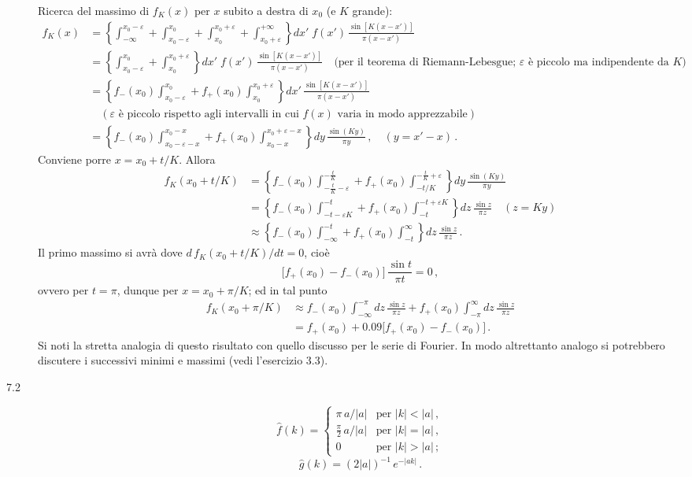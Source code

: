 \documentclass[11pt, a4paper]{book}
\numberwithin{equation}{section}
\begin{document}
\begin{description}
Ricerca del massimo di $f_K(x)$ per $x$ subito a destra di $x_0$ (e $K$ grande):
\begin{align*}
  f_K(x) &= \left\{\int_{-\infty}^{x_0-\varepsilon}+\int_{x_0-\varepsilon}^{x_0}+\int_{x_0}^{x_0+\varepsilon}+\int_{x_0+\varepsilon}^{+\infty}\right\}dx'\;f(x')\,\frac{\sin[K(x-x')]}{\pi(x-x')}\\
  &= \left\{\int_{x_0-\varepsilon}^{x_0}+\int_{x_0}^{x_0+\varepsilon}\right\}dx'\;f(x')\,\frac{\sin[K(x-x')]}{\pi(x-x')}
    \quad\text{(per il teorema di Riemann-Lebesgue; }\varepsilon\text{ è piccolo ma indipendente da }K\text{)}\\
  &= \left\{f_-(x_0)\int_{x_0-\varepsilon}^{x_0}+f_+(x_0)\int_{x_0}^{x_0+\varepsilon}\right\}dx'\,\frac{\sin[K(x-x')]}{\pi(x-x')}\\
  &\quad(\varepsilon\text{ è piccolo rispetto agli intervalli in cui }f(x)\text{ varia in modo apprezzabile})\\
  &= \left\{f_-(x_0)\int_{x_0-\varepsilon-x}^{x_0-x}+f_+(x_0)\int_{x_0-x}^{x_0+\varepsilon-x}\right\}dy\,\frac{\sin(Ky)}{\pi y}\,,
    \quad(y=x'-x)\,.
\end{align*}
Conviene porre $x = x_0+t/K$. Allora
\begin{align*}
  f_K(x_0+t/K) &= \left\{f_-(x_0)\int_{-\frac{t}{K}-\varepsilon}^{-\frac{t}{K}}+f_+(x_0)\int_{-t/K}^{-\frac{t}{K}+\varepsilon}\right\}dy\,\frac{\sin(Ky)}{\pi y}\\
  &= \left\{f_-(x_0)\int_{-t-\varepsilon K}^{-t}+f_+(x_0)\int_{-t}^{-t+\varepsilon K}\right\}dz\,\frac{\sin z}{\pi z}
    \quad(z=Ky)\\
  &\approx \left\{f_-(x_0)\int_{-\infty}^{-t}+f_+(x_0)\int_{-t}^{\infty}\right\}dz\,\frac{\sin z}{\pi z}\,.
\end{align*}
Il primo massimo si avrà dove $d\,f_K(x_0+t/K)/dt=0$, cioè
\[
  \bigl[f_+(x_0)-f_-(x_0)\bigr]\,\frac{\sin t}{\pi t} = 0\,,
\]
ovvero per $t=\pi$, dunque per $x = x_0+\pi/K$; ed in tal punto
\begin{align*}
  f_K(x_0+\pi/K) &\approx f_-(x_0)\int_{-\infty}^{-\pi}dz\,\frac{\sin z}{\pi z}+f_+(x_0)\int_{-\pi}^{\infty}dz\,\frac{\sin z}{\pi z}\\
  &= f_+(x_0)+0.09\bigl[f_+(x_0)-f_-(x_0)\bigr]\,.
\end{align*}
Si noti la stretta analogia di questo risultato con quello discusso per le serie di Fourier. In modo altrettanto analogo si potrebbero discutere i successivi minimi e massimi (vedi l'esercizio 3.3).

\item[7.2]
\[
  \hat{f}(k) = \begin{cases} \pi\,a/|a| & \text{per } |k|<|a|\,, \\ \frac{\pi}{2}\,a/|a| & \text{per } |k|=|a|\,, \\ 0 & \text{per } |k|>|a|\,; \end{cases}
\]
\[
  \hat{g}(k) = (2|a|)^{-1}\,e^{-|ak|}\,.
\]


\end{description}
\end{document}
